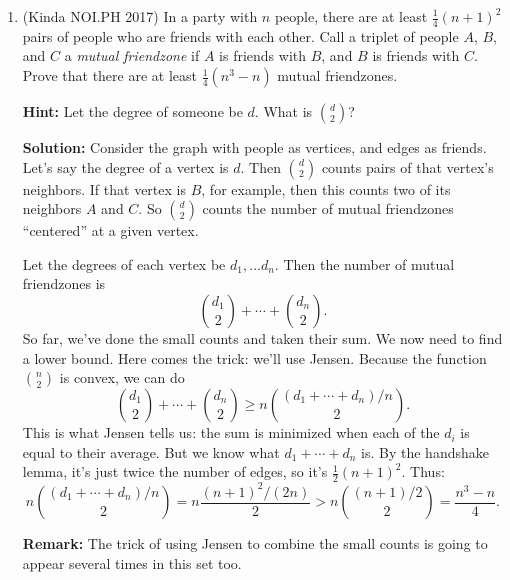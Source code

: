 \documentclass[11pt,paper=letter]{scrartcl}
\begin{document}
\begin{enumerate}
The first part of our solution shows $T \ge n\binom{k}{2}$: for each point, we can find at least $\binom{k}{2}$ triplets. The second part of our solution shows that $T \le 2\binom{n}{2}$: each pair of points gives at most two triplets. It's combining these that gives the inequality.

If we wanted to, we can write the previous solution in this way as well. The triplets you're counting are three points, $a$, $b$, and $c$, such that $c$ has distance $1$ from the line formed by $a$ and $b$. The first part of the solution showed $T \le 4\binom{n}{2}$, because each pair of points gives at most $4$ triplets. The second part of the solution shows that $T$ is at least $3$ times the number of triangles, because each triangle of area $1$ gives three triplets.

\item (Kinda NOI.PH 2017) In a party with $n$ people, there are at least $\frac{1}{4}(n + 1)^2$ pairs of people who are friends with each other. Call a triplet of people $A$, $B$, and $C$ a \textit{mutual friendzone} if $A$ is friends with $B$, and $B$ is friends with $C$. Prove that there are at least $\frac{1}{4}(n^3 - n)$ mutual friendzones.

\textbf{Hint:} Let the degree of someone be $d$. What is $\binom{d}{2}$?

\textbf{Solution:} Consider the graph with people as vertices, and edges as friends. Let's say the degree of a vertex is $d$. Then $\binom{d}{2}$ counts pairs of that vertex's neighbors. If that vertex is $B$, for example, then this counts two of its neighbors $A$ and $C$. So $\binom{d}{2}$ counts the number of mutual friendzones ``centered'' at a given vertex.

Let the degrees of each vertex be $d_1, \ldots d_n$. Then the number of mutual friendzones is \[
  \binom{d_1}{2} + \cdots + \binom{d_n}{2}.
\]
So far, we've done the small counts and taken their sum. We now need to find a lower bound. Here comes the trick: we'll use Jensen. Because the function $\binom{n}{2}$ is convex, we can do \[
  \binom{d_1}{2} + \cdots + \binom{d_n}{2} \ge n\binom{\left(d_1 + \cdots + d_n\right)/n}{2}.
\]
This is what Jensen tells us: the sum is minimized when each of the $d_i$ is equal to their average. But we know what $d_1 + \cdots + d_n$ is. By the handshake lemma, it's just twice the number of edges, so it's $\frac{1}{2}(n + 1)^2$. Thus:
\[
  n\binom{\left(d_1 + \cdots + d_n\right)/n}{2} = n\frac{(n + 1)^2/(2n)}{2} > n\binom{(n + 1)/2}{2} = \frac{n^3 - n}{4}.
\]

\textbf{Remark:} The trick of using Jensen to combine the small counts is going to appear several times in this set too. 

\end{enumerate}
\end{document}
